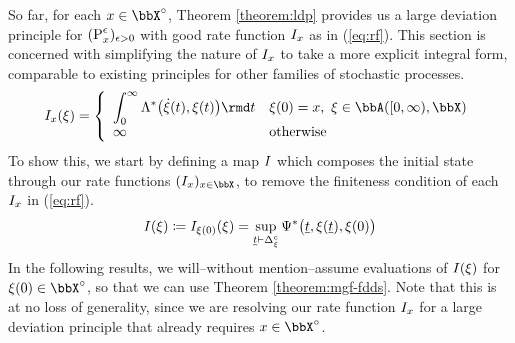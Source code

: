 So far, for each $\stateVar \in \stateSpace^\circ$, Theorem \ref{theorem:ldp} provides us a large deviation principle for $({\operatorname{P}}^\epsilon_x)_{\epsilon>0}$ with good rate function $I_x$ as in (\ref{eq:rf}).
This section is concerned with simplifying the nature of $I_x$ to take a more explicit integral form, comparable to existing principles for other families of stochastic processes.
\begin{equation*}
  \rf_\stateVar(\pathVar) = \left\{\begin{array}{ll}
    \displaystyle \int_0^\infty \ode^*\big(\dot\pathVar(t), \pathVar(t)\big) \rmd t & \pathVar(0) = \stateVar, ~ \pathVar \in \acpathSpace{[0,\infty)}{\stateSpace} \\
    \infty & \text{otherwise}
  \end{array}\right.
\end{equation*}
To show this, we start by defining a map $I$ which composes the initial state through our rate functions $(\rf_\stateVar)_{\stateVar\in\stateSpace}$, to remove the finiteness condition of each $I_x$ in (\ref{eq:rf}).
\begin{equation*}
  I(\xi) \coloneqq I_{\xi(0)}(\xi) = \sup_{\underline t \vdash \Delta_\xi^c} \Psi^*\big(\underline t, \xi(\underline t), \xi(0) \big)
\end{equation*}
In the following results, we will--without mention--assume evaluations of $I(\xi)$ for $\pathVar(0) \in \stateSpace^\circ$, so that we can use Theorem \ref{theorem:mgf-fdds}.
Note that this is at no loss of generality, since we are resolving our rate function $I_x$ for a large deviation principle that already requires $\stateVar \in \stateSpace^\circ$.













